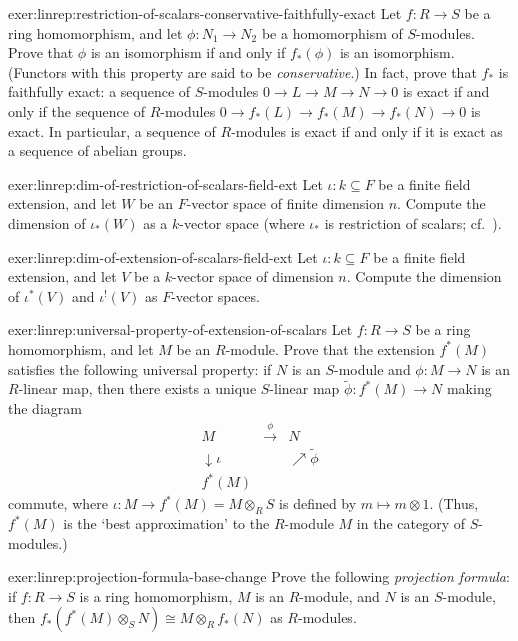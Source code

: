 \begin{exer}{}{exer:linrep:restriction-of-scalars-conservative-faithfully-exact}
  Let $f : R \to S$ be a ring homomorphism, and let
  $\phi : N_1 \to N_2$ be a homomorphism of $S$-modules. Prove that
  $\phi$ is an isomorphism if and only if $f_*(\phi)$ is an
  isomorphism. (Functors with this property are said to be
  \emph{conservative}.) In fact, prove that $f_*$ is faithfully exact:
  a sequence of $S$-modules $0 \to L \to M \to N \to 0$ is exact if
  and only if the sequence of $R$-modules
  $0 \to f_*(L) \to f_*(M) \to f_*(N) \to 0$ is exact.  In particular,
  a sequence of $R$-modules is exact if and only if it is exact as a
  sequence of abelian groups.
\end{exer}
\begin{exer}{}{exer:linrep:dim-of-restriction-of-scalars-field-ext}
  Let $\iota : k \subseteq F$ be a finite field extension, and let $W$
  be an $F$-vector space of finite dimension $n$. Compute the
  dimension of $\iota_*(W)$ as a $k$-vector space (where $\iota_*$ is
  restriction of scalars; cf.\
  ).
\end{exer}
\begin{exer}{}{exer:linrep:dim-of-extension-of-scalars-field-ext}
  Let $\iota : k \subseteq F$ be a finite field extension, and let $V$
  be a $k$-vector space of dimension $n$. Compute the dimension of
  $\iota^*(V)$ and $\iota^!(V)$ as $F$-vector spaces.
\end{exer}
\begin{exer}{}{exer:linrep:universal-property-of-extension-of-scalars}
  Let $f : R \to S$ be a ring homomorphism, and let $M$ be an
  $R$-module. Prove that the extension $f^*(M)$ satisfies the
  following universal property: if $N$ is an $S$-module and
  $\phi : M \to N$ is an $R$-linear map, then there exists a unique
  $S$-linear map $\tilde\phi : f^*(M) \to N$ making the diagram
  \[
    \begin{array}{ccc}
      M & \xrightarrow{\phi} & N \\
      \downarrow\iota & & \nearrow\tilde\phi \\
      f^*(M) & &
    \end{array}
  \]
  commute, where $\iota : M \to f^*(M) = M \otimes_R S$ is defined by
  $m \mapsto m \otimes 1$. (Thus, $f^*(M)$ is the `best approximation'
  to the $R$-module $M$ in the category of $S$-modules.)
\end{exer}
\begin{exer}{}{exer:linrep:projection-formula-base-change}
  Prove the following \emph{projection formula}: if $f : R \to S$ is a
  ring homomorphism, $M$ is an $R$-module, and $N$ is an $S$-module,
  then $f_*(f^*(M) \otimes_S N) \cong M \otimes_R f_*(N)$ as
  $R$-modules.
\end{exer}
